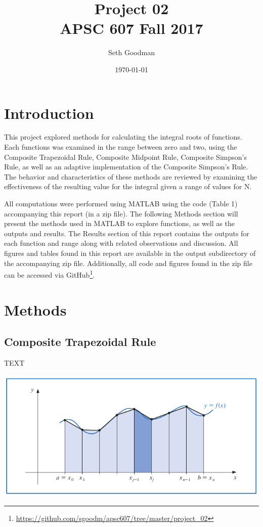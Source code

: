 \documentclass[a4paper]{article}
\title{
	Project 02 \\
	\bigskip
	\normalsize APSC 607 Fall 2017
}
\author{Seth Goodman}
\date{\today}
\begin{document}
\maketitle



\section{Introduction}
\label{sec:introduction}


This project explored methods for calculating the integral roots of functions. Each functions was  examined in the range between zero and two, using the Composite Trapezoidal Rule, Composite Midpoint Rule, Composite Simpson’s Rule, as well as an adaptive implementation of the Composite Simpson’s Rule. The behavior and characteristics of these methods are reviewed by examining the effectiveness of the resulting value for the integral given a range of values for N. 

All computations were performed using MATLAB using the code (Table 1) accompanying this report (in a zip file). The following Methods section will present the methods used in MATLAB to explore functions, as well as the outputs and results. The Results section of this report contains the outputs for each function and range along with related observations and discussion. All figures and tables found in this report are available in the output subdirectory of the accompanying zip file. Additionally, all code and figures found in the zip file can be accessed via GitHub\footnote{\url{https://github.com/sgoodm/apsc607/tree/master/project_02}}.



\newpage
\section{Methods}
\label{sec:methods}


\subsection{Composite Trapezoidal Rule}
TEXT

\begin{center}
	\includegraphics[width=1\textwidth]{../additional/trapezoidal_fig.png}
	\label{fig:trap_fig}
\end{center}
\end{document}
